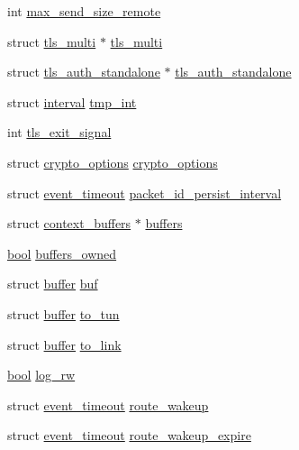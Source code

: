 \begin{DoxyCompactItemize}
int \hyperlink{structcontext__2_ae6f0527ab232f363c7f724d72ff9ccbe}{max\+\_\+send\+\_\+size\+\_\+remote}
\item 
struct \hyperlink{structtls__multi}{tls\+\_\+multi} $\ast$ \hyperlink{structcontext__2_a758cf7724377be181e7fab59b7a2a30e}{tls\+\_\+multi}
\item 
struct \hyperlink{structtls__auth__standalone}{tls\+\_\+auth\+\_\+standalone} $\ast$ \hyperlink{structcontext__2_a5504671bac689290cd35901bf7d031aa}{tls\+\_\+auth\+\_\+standalone}
\item 
struct \hyperlink{structinterval}{interval} \hyperlink{structcontext__2_a5fd70b82d77870b98844a107ce3cf7dd}{tmp\+\_\+int}
\item 
int \hyperlink{structcontext__2_aea6f45bc37c7c473a4ba3871d43ea2d5}{tls\+\_\+exit\+\_\+signal}
\item 
struct \hyperlink{structcrypto__options}{crypto\+\_\+options} \hyperlink{structcontext__2_a901a1a0ceb94dbd3e9f758552fa4fbd9}{crypto\+\_\+options}
\item 
struct \hyperlink{structevent__timeout}{event\+\_\+timeout} \hyperlink{structcontext__2_ab43cb5718dec488e16b44b0646d12a83}{packet\+\_\+id\+\_\+persist\+\_\+interval}
\item 
struct \hyperlink{structcontext__buffers}{context\+\_\+buffers} $\ast$ \hyperlink{structcontext__2_ae2e304ff3393a09ee15f7490f50b89d8}{buffers}
\item 
\hyperlink{automatic_8c_abb452686968e48b67397da5f97445f5b}{bool} \hyperlink{structcontext__2_aa0413cae96937fb6fca54e18e5b5d3d7}{buffers\+\_\+owned}
\item 
struct \hyperlink{structbuffer}{buffer} \hyperlink{structcontext__2_acb9836ce1e5f8cdc0b88ce89380fb7b0}{buf}
\item 
struct \hyperlink{structbuffer}{buffer} \hyperlink{structcontext__2_a913dbf251774ae01f77289e5a4965704}{to\+\_\+tun}
\item 
struct \hyperlink{structbuffer}{buffer} \hyperlink{structcontext__2_a8b773ace2cf22bd200b316517ac68b9f}{to\+\_\+link}
\item 
\hyperlink{automatic_8c_abb452686968e48b67397da5f97445f5b}{bool} \hyperlink{structcontext__2_acfe86f2a045249246aeda38971cbceaa}{log\+\_\+rw}
\item 
struct \hyperlink{structevent__timeout}{event\+\_\+timeout} \hyperlink{structcontext__2_ae8340ca648a8ecd965445186cf3a0ec1}{route\+\_\+wakeup}
\item 
struct \hyperlink{structevent__timeout}{event\+\_\+timeout} \hyperlink{structcontext__2_a328c64e187c662be87e6b8ea738a76cb}{route\+\_\+wakeup\+\_\+expire}

\end{DoxyCompactItemize}
